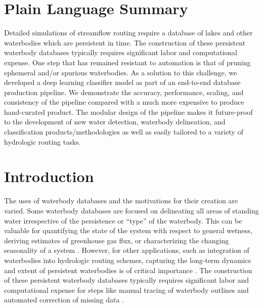 \documentclass{article}
\begin{document}
\section*{Plain Language Summary}
	Detailed simulations of streamflow routing require a database of lakes and other waterbodies which are persistent in time.  The construction of these persistent waterbody databases typically requires significant labor and computational expense. One step that has remained resistant to automation is that of pruning ephemeral and/or spurious waterbodies. As a solution to this challenge, we developed a deep learning classifier model as part of an end-to-end database production pipeline. We demonstrate the accuracy, performance, scaling, and consistency of the pipeline compared with a much more expensive to produce hand-curated product. The modular design of the pipeline makes it future-proof to the development of new water detection, waterbody delineation, and classification products/methodologies as well as easily tailored to a variety of hydrologic routing tasks.

\section{Introduction}
The uses of waterbody databases and the motivations for their creation are varied. Some waterbody databases are focused on delineating all areas of standing water irrespective of the persistence or “type” of the waterbody. This can be valuable for quantifying the state of the system with respect to general wetness, deriving estimates of greenhouse gas flux, or  characterizing the changing seasonality of a system \citep{cooleyArcticBorealLake2019, mullenUsingHighResolution2023}. However, for other applications, such as integration of waterbodies into hydrologic routing schemes, capturing the long-term dynamics and extent of persistent waterbodies is of critical importance \citep{davidDecadeRAPIDReflections2016,mizukamiVectorBasedRiver2021}. The construction of these persistent waterbody databases typically requires significant labor and computational expense for steps like manual tracing of waterbody outlines and automated correction of missing data \citep{amatulliHydrography90mNewHighresolution2022,lehnerGlobalRiverHydrography2013}.
\end{document}
